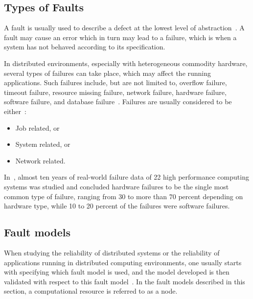 \documentclass{cslthse-msc}
\begin{document}
\subsection{Types of Faults} \label{subsec:background_types_of_faults}
A fault is usually used to describe a defect at the lowest level of abstraction~\cite{faultTolerantFundamentals}. A fault may cause an error which in turn may lead to a failure, which is when a system has not behaved according to its specification.

In distributed environments, especially with heterogeneous commodity hardware, several types of failures can take place, which may affect the running applications. Such failures include, but are not limited to, overflow failure, timeout failure, resource missing failure, network failure, hardware failure, software failure, and database failure~\cite{cloudServiceRel}. Failures are usually considered to be either~\cite{evalOfGridRel}:

\begin{itemize}
	\item Job related, or
	\item System related, or
	\item Network related.
\end{itemize}

In~\cite{studyOfFailures}, almost ten years of real-world failure data of 22 high performance computing systems was studied and concluded hardware failures to be the single most common type of failure, ranging from 30 to more than 70 percent depending on hardware type, while 10 to 20 percent of the failures were software failures.

\subsection{Fault models} \label{subsec:background_fault_models}
When studying the reliability of distributed systems or the reliability of applications running in distributed computing environments, one usually starts with specifying which fault model is used, and the model developed is then validated with respect to this fault model~\cite{faultTolerantFundamentals}. In the fault models described in this section, a computational resource is referred to as a node.
\end{document}

